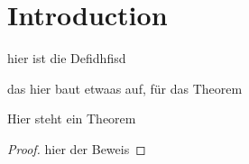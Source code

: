 \chapter{Introduction}

\begin{definition}
    hier ist die Defidhfisd
\end{definition}
\begin{lemma}
    das hier baut etwaas auf, für das Theorem
\end{lemma}
\begin{theorem}
    Hier steht ein Theorem
\end{theorem}
\begin{proof}
    hier der Beweis
\end{proof}
